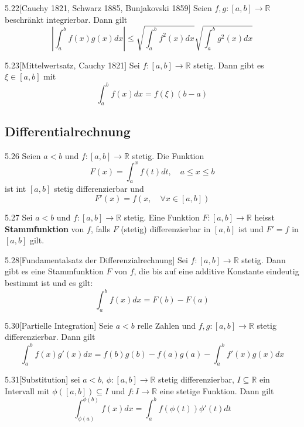 \documentclass[8pt,a4paper,twocolumn,table]{extarticle}
\newcommand{\R}{\mathbb{R}}
\begin{document}
\begin{satz}{5.22}[Cauchy 1821, Schwarz 1885, Bunjakovski 1859]
    Seien $f,g: [a,b] \to \R$ beschränkt integrierbar. Dann gilt
    \[ \left| \int_a^b f(x)g(x) dx \right| \le \sqrt{\int_a^b f^2(x)dx} \sqrt{\int_a^b g^2(x)dx} \]
\end{satz}

\begin{satz}{5.23}[Mittelwertsatz, Cauchy 1821]
    Sei $f: [a,b] \to \R$ stetig. Dann gibt es $\xi \in [a,b]$ mit
    \[ \int_a^b f(x) dx = f(\xi)(b-a) \]
\end{satz}

\subsection{Differentialrechnung}

\begin{satz}{5.26}
    Seien $a < b$ und $f: [a, b] \to \R$ stetig. Die Funktion
    \[ F(x) = \int_a^x f(t) dt,\quad a \le x \le b \]
    ist int $[a, b]$ stetig differenzierbar und
    \[ F'(x) = f(x, \quad \forall x \in [a, b]) \]
\end{satz}

\begin{definition}{5.27}
    Sei $a < b$ und $f: [a,b] \to \R$ stetig. Eine Funktion $F: [a,b ] \to \R$ heisst \textbf{Stammfunktion} von $f$, falls $F$
    (stetig) differenzierbar in $[a, b]$ ist und $F' = f$ in $[a, b]$ gilt.
\end{definition}

\begin{satz}{5.28}[Fundamentalsatz der Differenzialrechnung]
    Sei $f: [a,b] \to \R$ stetig. Dann gibt es eine Stammfunktion $F$ von $f$, die bis auf eine additive Konstante eindeutig bestimmt ist und es gilt:
    \[ \int_a^b f(x)dx = F(b) - F(a) \]
\end{satz}

\begin{satz}{5.30}[Partielle Integration]
    Seie $a<b$ relle Zahlen und $f,g: [a,b] \to \R$ stetig differenzierbar. Dann gilt
    \[ \int_a^b f(x)g'(x)dx = f(b)g(b) - f(a)g(a) - \int_a^b f'(x)g(x)dx \]
\end{satz}

\begin{satz}{5.31}[Substitution]
    sei $a < b$, $\phi: [a, b] \to \R$ stetig differenzierbar, $I \subseteq  \R$ ein Intervall mit $\phi([a, b]) \subseteq I$ und $f: I \to \R$ eine stetige Funktion.
    Dann gilt
    \[ \int_{\phi(a)}^{\phi(b)} f(x)dx = \int_a^b f(\phi(t)) \phi'(t) dt \]
\end{satz}
\end{document}
